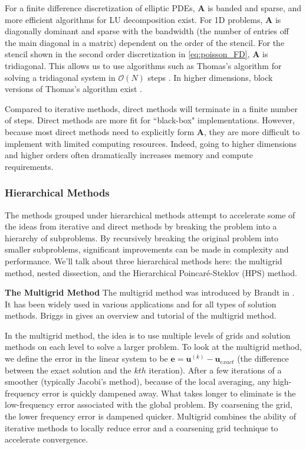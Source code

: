 For a finite difference discretization of elliptic PDEs, $\textbf{A}$ is banded and sparse, and more efficient algorithms for LU decomposition exist. For 1D problems, $\textbf{A}$ is diagonally dominant and sparse with the bandwidth (the number of entries off the main diagonal in a matrix) dependent on the order of the stencil. For the stencil shown in the second order discretization in \ref{eq:poisson_FD}, $\textbf{A}$ is tridiagonal. This allows us to use algorithms such as Thomas's algorithm for solving a tridiagonal system in $\mathcal{O}(N)$ steps \citep{higham2002accuracy}. In higher dimensions, block versions of Thomas's algorithm exist \citep{quarteroni2010numerical}.

Compared to iterative methods, direct methods will terminate in a finite number of steps. Direct methods are more fit for ``black-box" implementations. However, because most direct methods need to explicitly form $\textbf{A}$, they are more difficult to implement with limited computing resources. Indeed, going to higher dimensions and higher orders often dramatically increases memory and compute requirements.

\subsubsection{Hierarchical Methods}
\label{sub:hierarchical-methods}

The methods grouped under hierarchical methods attempt to accelerate some of the ideas from iterative and direct methods by breaking the problem into a hierarchy of subproblems. By recursively breaking the original problem into smaller subproblems, significant improvements can be made in complexity and performance. We'll talk about three hierarchical methods here: the multigrid method, nested dissection, and the Hierarchical Poincaré-Steklov (HPS) method.


{\bf The Multigrid Method}
The multigrid method was introduced by Brandt in \citep{brandt1977multi}. It has been widely used in various applications and for all types of solution methods. Briggs in \citep{briggs2000multigrid} gives an overview and tutorial of the multigrid method.

In the multigrid method, the idea is to use multiple levels of grids and solution methods on each level to solve a larger problem. To look at the multigrid method, we define the error in the linear system to be $\textbf{e} = \textbf{u}^{(k)} - \textbf{u}_{exact}$ (the difference between the exact solution and the $kth$ iteration). After a few iterations of a smoother (typically Jacobi's method), because of the local averaging, any high-frequency error is quickly dampened away. What takes longer to eliminate is the low-frequency error associated with the global problem. By coarsening the grid, the lower frequency error is dampened quicker. Multigrid combines the ability of iterative methods to locally reduce error and a coarsening grid technique to accelerate convergence.

